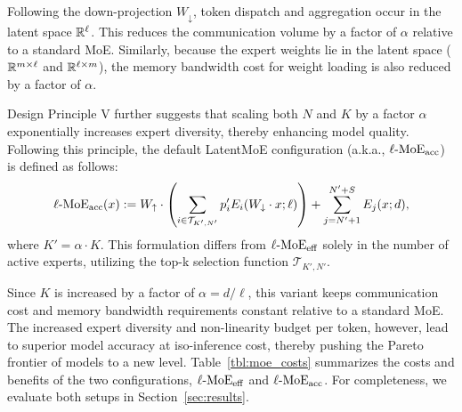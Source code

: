 Following the down-projection $W_\downarrow$, token dispatch and aggregation occur in the latent space $\mathbb{R}^\ell$. This reduces the communication volume by a factor of $\alpha$ relative to a standard MoE. Similarly, because the expert weights lie in the latent space ($\mathbb{R}^{m \times \ell}$ and $\mathbb{R}^{\ell \times m}$), the memory bandwidth cost for weight loading is also reduced by a factor of $\alpha$.

Design Principle V further suggests that scaling both $N$ and $K$ by a factor $\alpha$ exponentially increases expert diversity, thereby enhancing model quality. Following this principle, the default LatentMoE configuration (a.k.a., $\operatorname{\ell-MoE}_\mathrm{acc}$) is defined as follows: 
\begin{equation}
\label{eq:latent_moe_acc}
\operatorname{\ell-MoE}_\mathrm{acc}(x) := W_{\uparrow} \cdot \left( \sum_{i \in \mathcal{T}_{K',N'}} p'_i E_i(W_\downarrow \cdot x; \ell) \right) + \sum_{j=N'+1}^{N'+S} E_j(x; d),
\end{equation}
where $K' = \alpha \cdot K$. This formulation differs from $\operatorname{\ell-MoE}_\mathrm{eff}$ solely in the number of active experts, utilizing the top-k selection function $\mathcal{T}_{K',N'}$.

Since $K$ is increased by a factor of $\alpha = d / \ell$, this variant keeps communication cost and memory bandwidth requirements constant relative to a standard MoE. The increased expert diversity and non-linearity budget per token, however, lead to superior model accuracy at iso-inference cost, thereby pushing the Pareto frontier of models to a new level. Table~\ref{tbl:moe_costs} summarizes the costs and benefits of the two configurations, $\operatorname{\ell-MoE}_\mathrm{eff}$ and $\operatorname{\ell-MoE}_\mathrm{acc}$. For completeness, we evaluate both setups in Section~\ref{sec:results}.



